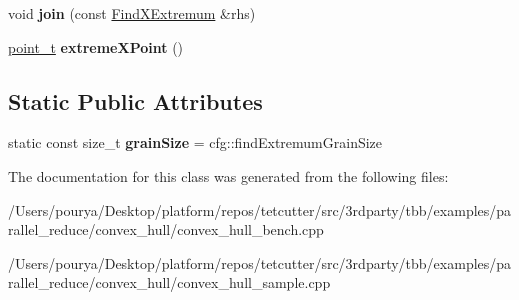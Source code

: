 \begin{DoxyCompactItemize}
\item 
\hypertarget{classFindXExtremum_a980cc1f34de3547ee0653efb5fbae98a}{}void {\bfseries join} (const \hyperlink{classFindXExtremum}{Find\+X\+Extremum} \&rhs)\label{classFindXExtremum_a980cc1f34de3547ee0653efb5fbae98a}

\item 
\hypertarget{classFindXExtremum_a2eee8fdbed2a1cebbd65beefa756cf83}{}\hyperlink{structutil_1_1point}{point\+\_\+t} {\bfseries extreme\+X\+Point} ()\label{classFindXExtremum_a2eee8fdbed2a1cebbd65beefa756cf83}

\end{DoxyCompactItemize}
\subsection*{Static Public Attributes}
\begin{DoxyCompactItemize}
\item 
\hypertarget{classFindXExtremum_a42d88d58066d240a8e6b7e5661759bc2}{}static const size\+\_\+t {\bfseries grain\+Size} = cfg\+::find\+Extremum\+Grain\+Size\label{classFindXExtremum_a42d88d58066d240a8e6b7e5661759bc2}

\end{DoxyCompactItemize}


The documentation for this class was generated from the following files\+:\begin{DoxyCompactItemize}
\item 
/\+Users/pourya/\+Desktop/platform/repos/tetcutter/src/3rdparty/tbb/examples/parallel\+\_\+reduce/convex\+\_\+hull/convex\+\_\+hull\+\_\+bench.\+cpp\item 
/\+Users/pourya/\+Desktop/platform/repos/tetcutter/src/3rdparty/tbb/examples/parallel\+\_\+reduce/convex\+\_\+hull/convex\+\_\+hull\+\_\+sample.\+cpp\end{DoxyCompactItemize}
